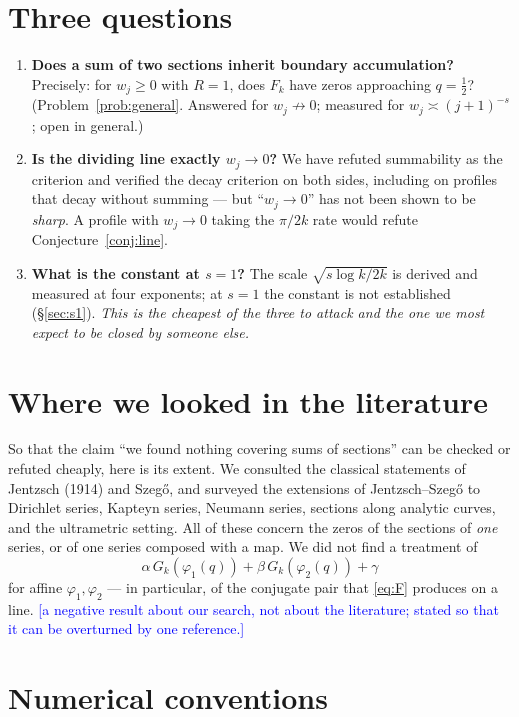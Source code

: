 \documentclass[11pt,a4paper]{article}
\theoremstyle{plain}
\theoremstyle{definition}
\theoremstyle{remark}
\newcommand{\STATUS}[1]{\textcolor{blue}{\textsf{[#1]}}}
\begin{document}
\section{Three questions}\label{sec:questions}

\begin{enumerate}
\item \textbf{Does a sum of two sections inherit boundary accumulation?} Precisely: for
      $w_j\ge0$ with $R=1$, does $F_k$ have zeros approaching $q=\tfrac12$?
      (Problem~\ref{prob:general}. Answered for $w_j\not\to0$;
      measured for $w_j\asymp(j+1)^{-s}$; open in general.)
\item \textbf{Is the dividing line exactly $w_j\to0$?} We have refuted summability as the
      criterion and verified the decay criterion on both sides, including on profiles
      that decay without summing --- but ``$w_j\to0$'' has not been shown to be
      \emph{sharp}. A profile with $w_j\to0$ taking the $\pi/2k$ rate would refute
      Conjecture~\ref{conj:line}.
\item \textbf{What is the constant at $s=1$?} The scale $\sqrt{s\log k/2k}$ is derived
      and measured at four exponents; at $s=1$ the constant is not established
      (\S\ref{sec:s1}). \emph{This is the cheapest of the three to attack and the one we
      most expect to be closed by someone else.}
\end{enumerate}

\section{Where we looked in the literature}\label{sec:lit}

So that the claim ``we found nothing covering sums of sections'' can be checked or
refuted cheaply, here is its extent. We consulted the classical statements of Jentzsch
(1914) and Szeg\H{o}, and surveyed the extensions of Jentzsch--Szeg\H{o} to Dirichlet
series, Kapteyn series, Neumann series, sections along analytic curves, and the
ultrametric setting. All of these concern the zeros of the sections of \emph{one}
series, or of one series composed with a map. We did not find a treatment of
\[
  \alpha\,G_k(\varphi_1(q))+\beta\,G_k(\varphi_2(q))+\gamma
\]
for affine $\varphi_1,\varphi_2$ --- in particular, of the conjugate pair that
\eqref{eq:F} produces on a line. \STATUS{a negative result about our search, not about
the literature; stated so that it can be overturned by one reference.}

\section{Numerical conventions}\label{sec:num}
\end{document}

